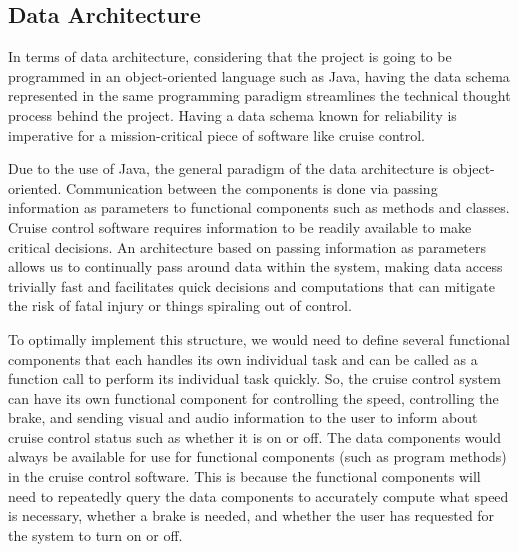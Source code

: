 \documentclass[preprint,11pt,3p]{article}
\begin{document}
\subsection{Data Architecture} 
In terms of data architecture, considering that the project is going to be programmed in an object-oriented language such as Java, having the data schema represented in the same programming paradigm streamlines the technical thought process behind the project. Having a data schema known for reliability is imperative for a mission-critical piece of software like cruise control.\par
Due to the use of Java, the general paradigm of the data architecture is object-oriented.  Communication between the components is done via passing information as parameters to functional components such as methods and classes. Cruise control software requires information to be readily available to make critical decisions. An architecture based on passing information as parameters allows us to continually pass around data within the system, making data access trivially fast and facilitates quick decisions and computations that can mitigate the risk of fatal injury or things spiraling out of control.\par
To optimally implement this structure, we would need to define several functional components that each handles its own individual task and can be called as a function call to perform its individual task quickly. So, the cruise control system can have its own functional component for controlling the speed, controlling the brake, and sending visual and audio information to the user to inform about cruise control status such as whether it is on or off. The data components would always be available for use for functional components (such as program methods) in the cruise control software. This is because the functional components will need to repeatedly query the data components to accurately compute what speed is necessary, whether a brake is needed, and whether the user has requested for the system to turn on or off.\par
 
\newpage
\end{document}
